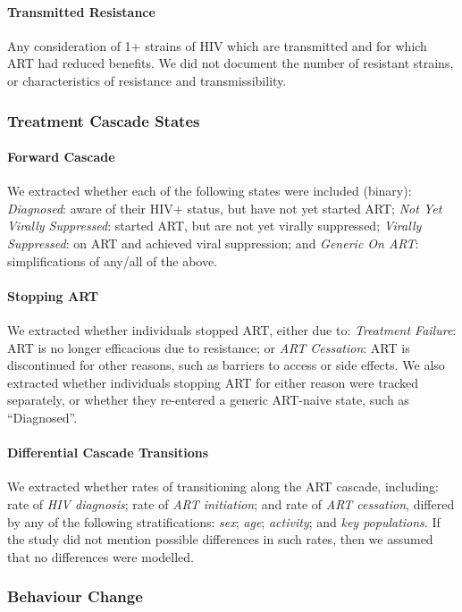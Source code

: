 \paragraph{Transmitted Resistance}
Any consideration of 1+ strains of HIV which are transmitted and for which ART had reduced benefits.
We did not document the number of resistant strains,
or characteristics of resistance and transmissibility.
\subsubsection{Treatment Cascade States}
\label{aaa:defs:cascade}
\paragraph{Forward Cascade}
We extracted whether each of the following states were included (binary):
\emph{Diagnosed}: aware of their HIV+ status, but have not yet started ART;
\emph{Not Yet Virally Suppressed}: started ART, but are not yet virally suppressed;
\emph{Virally Suppressed}: on ART and achieved viral suppression; and
\emph{Generic On ART}: simplifications of any/all of the above.
\paragraph{Stopping ART}
We extracted whether individuals stopped ART, either due to:
\emph{Treatment Failure}: ART is no longer efficacious due to resistance; or
\emph{ART Cessation}: ART is discontinued for other reasons,
such as barriers to access or side effects.
We also extracted whether individuals stopping ART for either reason
were tracked separately, or whether they re-entered a generic ART-naive state,
such as ``Diagnosed''.
\paragraph{Differential Cascade Transitions}
We extracted whether rates of transitioning along the ART cascade, including:
rate of \emph{HIV diagnosis}; rate of \emph{ART initiation}; and rate of \emph{ART cessation},
differed by any of the following stratifications:
\emph{sex}; \emph{age}; \emph{activity}; and \emph{key populations}.
If the study did not mention possible differences in such rates,
then we assumed that no differences were modelled.
\subsubsection{Behaviour Change}
\label{aaa:defs:bc}
